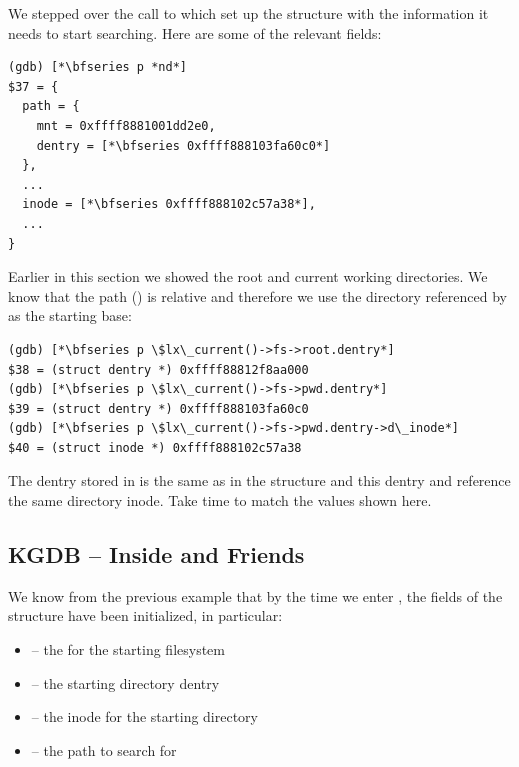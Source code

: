 \noindent
We stepped over the call to  which set up the  structure with the information it needs to start searching. Here are some of the relevant fields:

\begin{lstlisting}
(gdb) [*\bfseries p *nd*]
$37 = {
  path = {
    mnt = 0xffff8881001dd2e0,
    dentry = [*\bfseries 0xffff888103fa60c0*]
  },
  ...
  inode = [*\bfseries 0xffff888102c57a38*],
  ...
}
\end{lstlisting}

\noindent
Earlier in this section we showed the root and current working directories. We know that the path () is relative and therefore we use the directory referenced by  as the starting base:

\begin{lstlisting}
(gdb) [*\bfseries p \$lx\_current()->fs->root.dentry*]
$38 = (struct dentry *) 0xffff88812f8aa000
(gdb) [*\bfseries p \$lx\_current()->fs->pwd.dentry*]
$39 = (struct dentry *) 0xffff888103fa60c0
(gdb) [*\bfseries p \$lx\_current()->fs->pwd.dentry->d\_inode*]
$40 = (struct inode *) 0xffff888102c57a38
\end{lstlisting}

\noindent
The dentry stored in  is the same as  in the  structure and this dentry and  reference the same directory inode. Take time to match the values shown here.


\subsection{KGDB -- Inside  and Friends}

We know from the previous example that by the time we enter , the fields of the  structure have been initialized, in particular:

\begin{itemize}
    \item {} -- the  for the starting filesystem
    \item {} -- the starting directory dentry
    \item {} -- the inode for the starting directory 
    \item {} -- the path to search for
\end{itemize}

